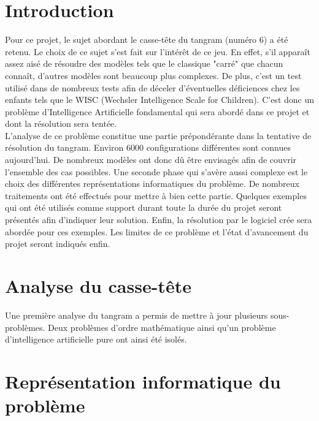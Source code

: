 \documentclass[a4paper, 11pt]{report}
\begin{document}
	\newpage
	
	
	
	\chapter*{Introduction}
	
		Pour ce projet, le sujet abordant le casse-tête du tangram (numéro 6) a été retenu. Le choix de ce sujet s'est fait sur l'intérêt de ce jeu. En effet, s'il apparaît assez aisé de résoudre des modèles tels que le classique "carré" que chacun connaît, d'autres modèles sont beaucoup plus complexes. De plus, c'est un test utilisé dans de nombreux tests afin de déceler d'éventuelles déficiences chez les enfants tels que le WISC (Wechsler Intelligence Scale for Children). C'est donc un problème d'Intelligence Artificielle fondamental qui sera abordé dans ce projet et dont la résolution sera tentée.\\
L'analyse de ce problème constitue une partie prépondérante dans la tentative de résolution du tangram. Environ 6000 configurations différentes sont connues aujourd'hui. De nombreux modèles ont donc dû être envisagés afin de couvrir l'ensemble des cas possibles. Une seconde phase qui s'avère aussi complexe est le choix des différentes représentations informatiques du problème. De nombreux traitements ont été effectués pour mettre à bien cette partie. Quelques exemples qui ont été utilisés comme support durant toute la durée du projet seront présentés afin d'indiquer leur solution. Enfin, la résolution par le logiciel crée sera abordée pour ces exemples. Les limites de ce problème et l'état d'avancement du projet seront indiqués enfin.


	\newpage

	\chapter{Analyse du casse-t\^ete}
	
	Une première analyse du tangram a permis de mettre à jour plusieurs sous-problèmes. Deux problèmes d'ordre mathématique ainsi qu'un problème d'intelligence artificielle pure ont ainsi été isolés. 
	
	
	\newpage
	
	\chapter{Représentation informatique du problème}
	
\end{document}
